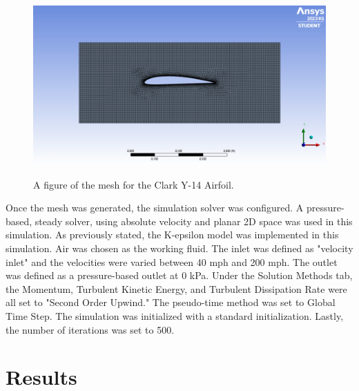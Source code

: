 \documentclass[
	12pt, %
]{fluids_report_style}
\begin{document}
\begin{figure}[H]%
    \centering
    {{\includegraphics[width=15cm]{figures/MeshFigure.jpg} }}%
    \caption{A figure of the mesh for the Clark Y-14 Airfoil.}
    \label{fig:Mesh}%
\end{figure}

Once the mesh was generated, the simulation solver was configured. A pressure-based, steady solver, using absolute velocity and planar 2D space was used in this simulation. As previously stated, the K-epsilon model was implemented in this simulation. Air was chosen as the working fluid. The inlet was defined as "velocity inlet" and the velocities were varied between 40 mph and 200 mph. The outlet was defined as a pressure-based outlet at 0 kPa. Under the Solution Methods tab, the Momentum, Turbulent Kinetic Energy, and Turbulent Dissipation Rate were all set to "Second Order Upwind." The pseudo-time method was set to Global Time Step. The simulation was initialized with a standard initialization. Lastly, the number of iterations was set to 500. 

\section{Results}

\end{document}
